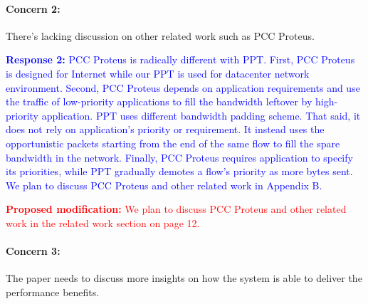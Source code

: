 \documentclass[12pt,one-column]{article}
\begin{document}
{\it \paragraph{Concern 2:} There's lacking discussion on other related work such as PCC Proteus.}

\noindent\textcolor{blue}{\textbf{Response 2:} PCC Proteus is radically different with PPT.
First, PCC Proteus is designed for Internet while our PPT is used for datacenter network environment.
Second, PCC Proteus depends on application requirements and use the traffic of low-priority applications to fill the bandwidth leftover by high-priority application. PPT uses different bandwidth padding scheme. That said, it does not rely on application's priority or requirement. It instead uses the opportunistic packets starting from the end of the same flow to fill the spare bandwidth in the network.
Finally, PCC Proteus requires application to specify its priorities, while PPT gradually demotes a flow's priority as more bytes sent. We plan to discuss PCC Proteus and other related work in Appendix B.}

\noindent\textcolor{red}{\textbf{Proposed modification: }
We plan to discuss PCC Proteus and other related work in the related work section on page 12.
}







{\it \paragraph{Concern 3:} The paper needs to discuss more insights on how the system is able to deliver the performance benefits.}
\end{document}

